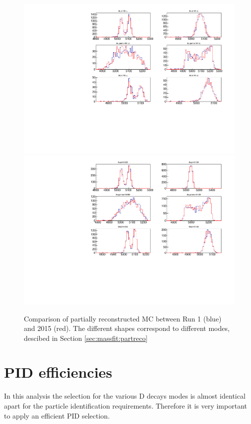 \begin{figure}[!h]
\includegraphics[width=\linewidth]{figures/compareMC/run1vsrun2MC_partreco_LL.pdf}
\includegraphics[width=\linewidth]{figures/compareMC/run1vsrun2MC_partreco_DD.pdf}
\caption{Comparison of partially reconstructed MC between Run 1 (blue) and 2015 (red). The different shapes correspond to different \Dstar\Kstar modes, descibed in Section \ref{sec:massfit:partreco}}
\label{parterecofits}
\end{figure}


\section{PID efficiencies}
\label{sec:mc:pid}

In this analysis the selection for the various D decays modes \decay{\D}{\kaon\pi, \kaon\kaon, \pi\pi, \pi\kaon} is almost identical apart for the particle identification requirements. Therefore it is very important to apply an efficient PID selection.

